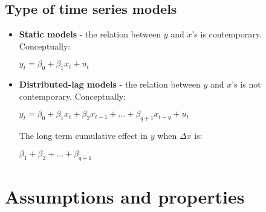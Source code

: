 \documentclass[10pt, a4paper, landscape]{extarticle}
\begin{document}
\begin{multicols}{3}
	\subsection*{Type of time series models}
		\begin{itemize}[leftmargin=*]
			\item \textbf{Static models} - the relation between $y$ and $x$'s is contemporary. Conceptually:
			\begin{center}
				$y_t = \beta_0 + \beta_1 x_t + u_t$
			\end{center}
			\item \textbf{Distributed-lag models} - the relation between $y$ and $x$'s is not contemporary. Conceptually:
			\begin{center}
				$y_t = \beta_0 + \beta_1 x_t + \beta_2 x_{t-1} + ... + \beta_{q+1} x_{t-q} + u_t$
			\end{center}
			The long term cumulative effect in $y$ when $\Delta x$ is:
			 \begin{center}
			 	$\beta_1 + \beta_2 + ... + \beta_{q+1}$
			 \end{center}
		\end{itemize}

\columnbreak

\section*{Assumptions and properties}

\end{multicols}
\end{document}
